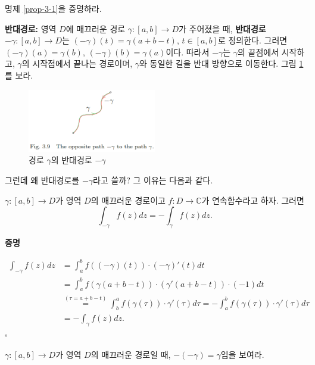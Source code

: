 \begin{salt_exercise} \label{ex-3-6}
명제 \ref{prop-3-1}을 증명하라.
\end{salt_exercise}

{\bf 반대경로:}
영역 $D$에 매끄러운 경로 $\gamma: [a,b] \to D$가 
주어졌을 때, {\bf 반대경로} $-\gamma: [a,b] \to D$는
$(-\gamma)(t) = \gamma(a+b-t)$, $t\in[a,b]$로 정의한다.
그러면 $(-\gamma)(a) = \gamma(b)$, $(-\gamma)(b) = \gamma(a)$이다.
따라서 $-\gamma$는 $\gamma$의 끝점에서 시작하고,
$\gamma$의 시작점에서 끝나는 경로이며,
$\gamma$와 동일한 길을 반대 방향으로 이동한다.
그림 \ref{fig-3-9}를 보라.
\begin{figure}[!h]
\begin{center}
\includegraphics[width=0.5\textwidth]{./SaltChapter/fig-3-9}
\end{center}
\caption{경로 $\gamma$의 반대경로 $-\gamma$}
\label{fig-3-9}
\end{figure}

그런데 왜 반대경로를 $-\gamma$라고 쓸까?
그 이유는 다음과 같다.

\begin{salt_prop} \label{prop-3-2}
$\gamma: [a,b] \to D$가 영역 $D$의 매끄러운 경로이고
$f:D\to\mathbb C$가 연속함수라고 하자. 그러면
\[
\int_{-\gamma} f(z)dz = - \int_\gamma f(z)dz.
\]
\end{salt_prop}

{\bf 증명}

\begin{align*}
\int_{-\gamma} f(z)dz
&= \int_a^b f((-\gamma)(t))\cdot (-\gamma)'(t)dt \\
&= \int_a^b f(\gamma(a+b-t))\cdot (\gamma'(a+b-t))\cdot(-1)dt \\
& \stackrel{(\tau=a+b-t)}=
\int_b^a f(\gamma(\tau))\cdot \gamma'(\tau)d\tau 
= - \int_a^b f(\gamma(\tau))\cdot \gamma'(\tau)d\tau \\
&= - \int_\gamma f(z)dz.
\end{align*}
\hfill $\square$

\begin{salt_exercise} \label{ex-3-7}
$\gamma: [a,b] \to D$가 영역 $D$의 매끄러운 경로일 때,
$-(-\gamma) = \gamma$임을 보여라.
\end{salt_exercise}

